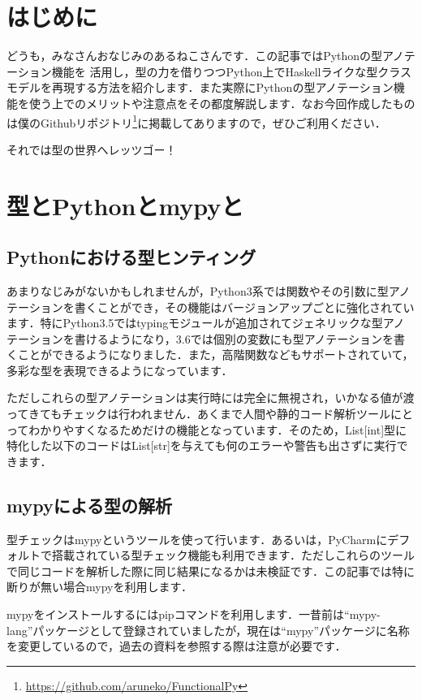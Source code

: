 \section{はじめに}
どうも，みなさんおなじみのあるねこさんです．この記事ではPythonの型アノテーション機能を
活用し，型の力を借りつつPython上でHaskellライクな型クラスモデルを再現する方法を紹介します．また実際にPythonの型アノテーション機能を使う上でのメリットや注意点をその都度解説します．なお今回作成したものは僕のGithubリポジトリ\footnote{\url{https://github.com/aruneko/FunctionalPy}}に掲載してありますので，ぜひご利用ください．

それでは型の世界へレッツゴー！

\section{型とPythonとmypyと}
\subsection{Pythonにおける型ヒンティング}
あまりなじみがないかもしれませんが，Python3系では関数やその引数に型アノテーションを書くことができ，その機能はバージョンアップごとに強化されています．特にPython3.5ではtypingモジュールが追加されてジェネリックな型アノテーションを書けるようになり，3.6では個別の変数にも型アノテーションを書くことができるようになりました．また，高階関数などもサポートされていて，多彩な型を表現できるようになっています．

ただしこれらの型アノテーションは実行時には完全に無視され，いかなる値が渡ってきてもチェックは行われません．あくまで人間や静的コード解析ツールにとってわかりやすくなるためだけの機能となっています．そのため，List[int]型に特化した以下のコードはList[str]を与えても何のエラーや警告も出さずに実行できます．


\subsection{mypyによる型の解析}
型チェックはmypyというツールを使って行います．あるいは，PyCharmにデフォルトで搭載されている型チェック機能も利用できます．ただしこれらのツールで同じコードを解析した際に同じ結果になるかは未検証です．この記事では特に断りが無い場合mypyを利用します．

mypyをインストールするにはpipコマンドを利用します．一昔前は``mypy-lang''パッケージとして登録されていましたが，現在は``mypy''パッケージに名称を変更しているので，過去の資料を参照する際は注意が必要です．

